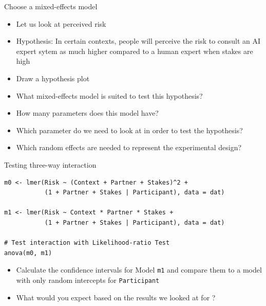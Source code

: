 \documentclass[aspectratio=169]{beamer}
\begin{document}
\begin{frame}[<+->]{Choose a mixed-effects model}
  \begin{itemize}
    \item Let us look at perceived risk
    \item Hypothesis: In certain contexts, people will perceive the risk to
      consult an AI expert sytem as much higher compared to a human expert when
      stakes are high
    \item Draw a hypothesis plot
    \item What mixed-effects model is suited to test this hypothesis?
    \item How many parameters does this model have?
    \item Which parameter do we need to look at in order to test the hypothesis?
    \item Which random effects are needed to represent the experimental design?
  \end{itemize}
\end{frame}

\begin{frame}[fragile]{Testing three-way interaction}
  \begin{lstlisting}
m0 <- lmer(Risk ~ (Context + Partner + Stakes)^2 +
           (1 + Partner + Stakes | Participant), data = dat)

m1 <- lmer(Risk ~ Context * Partner * Stakes +
           (1 + Partner + Stakes | Participant), data = dat)

# Test interaction with Likelihood-ratio Test
anova(m0, m1)
  \end{lstlisting}
  \pause
  \begin{itemize}
    \item Calculate the confidence intervals for Model \texttt{m1} and compare
      them to a model with only random intercepts for \texttt{Participant}
    \item What would you expect based on the results we looked at for
      \citet{Aungle2023}?
  \end{itemize}
\end{frame}
\end{document}
